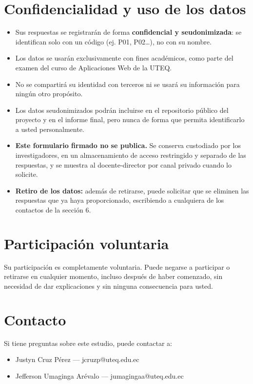 \documentclass[11pt,a4paper]{article}
\newcommand{\vin}{\textcolor{dorado}{\textbullet}\hspace{1.6mm}}
\begin{document}
\section{Confidencialidad y uso de los datos}
\begin{itemize}[leftmargin=6mm, label=\vin, itemsep=1.6mm, topsep=1mm, parsep=0pt]
  \item Sus respuestas se registrar\'an de forma \textbf{confidencial y seudonimizada}:
        se identifican solo con un c\'odigo (ej. P01, P02\ldots), no con su nombre.
  \item Los datos se usar\'an exclusivamente con fines acad\'emicos, como parte del examen del
        curso de Aplicaciones Web de la UTEQ.
  \item No se compartir\'a su identidad con terceros ni se usar\'a su informaci\'on para ning\'un
        otro prop\'osito.
  \item Los datos seudonimizados podr\'an incluirse en el repositorio p\'ublico del proyecto y en
        el informe final, pero nunca de forma que permita identificarlo a usted personalmente.
  \item \textbf{Este formulario firmado no se publica.} Se conserva custodiado por los
        investigadores, en un almacenamiento de acceso restringido y separado de las respuestas,
        y se muestra al docente-director por canal privado cuando lo solicite.
  \item \textbf{Retiro de los datos:} adem\'as de retirarse, puede solicitar que se eliminen las
        respuestas que ya haya proporcionado, escribiendo a cualquiera de los contactos de la
        secci\'on 6.
\end{itemize}

\section{Participaci\'on voluntaria}
Su participaci\'on es completamente voluntaria. Puede negarse a participar o retirarse en cualquier
momento, incluso despu\'es de haber comenzado, sin necesidad de dar explicaciones y sin ninguna
consecuencia para usted.

\section{Contacto}
Si tiene preguntas sobre este estudio, puede contactar a:
\begin{itemize}[leftmargin=6mm, label=\vin, itemsep=1.4mm, topsep=1mm, parsep=0pt]
  \item Justyn Cruz P\'erez --- jcruzp@uteq.edu.ec
  \item Jefferson Umaginga Ar\'evalo --- jumagingaa@uteq.edu.ec
\end{itemize}
\end{document}
